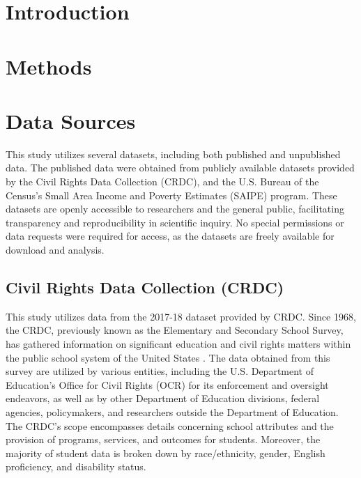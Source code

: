 \documentclass[sn-mathphys-num]{sn-jnl}%
\theoremstyle{thmstyleone}%
\theoremstyle{thmstyletwo}%
\theoremstyle{thmstylethree}%
\begin{document}
\section{Introduction}\label{sec:Intro}


\section{Methods}\label{sec:Methods}
\section{Data Sources}
This study utilizes several datasets, including both published and unpublished data. The published data were obtained from publicly available datasets provided by the Civil Rights Data Collection (CRDC), and the U.S. Bureau of the Census's Small Area Income and Poverty Estimates (SAIPE) program. These datasets are openly accessible to researchers and the general public, facilitating transparency and reproducibility in scientific inquiry. No special permissions or data requests were required for access, as the datasets are freely available for download and analysis. %

\subsection{Civil Rights Data Collection (CRDC)}
This study utilizes data from the 2017-18 dataset provided by CRDC. Since 1968, the CRDC, previously known as the Elementary and Secondary School Survey, has gathered information on significant education and civil rights matters within the public school system of the United States \cite{crdc_manual}. The data obtained from this survey are utilized by various entities, including the U.S. Department of Education’s Office for Civil Rights (OCR) for its enforcement and oversight endeavors, as well as by other Department of Education divisions, federal agencies, policymakers, and researchers outside the Department of Education. The CRDC's scope encompasses details concerning school attributes and the provision of programs, services, and outcomes for students. Moreover, the majority of student data is broken down by race/ethnicity, gender, English proficiency, and disability status.\\
\end{document}
